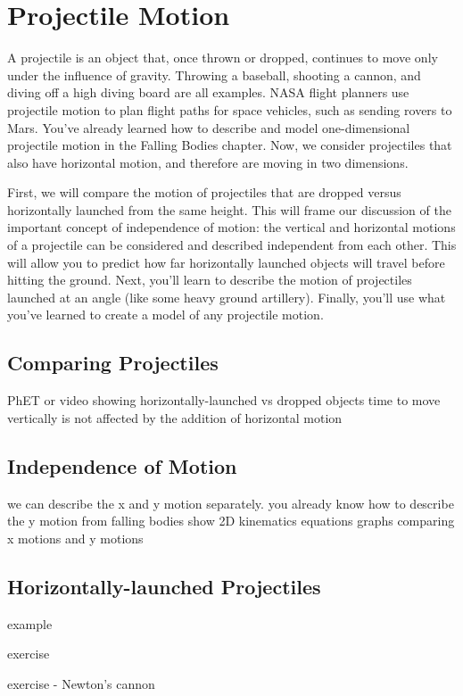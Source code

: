 \chapter{Projectile Motion}

A projectile is an object that, once thrown or dropped, continues to move only 
under the influence of gravity. Throwing a baseball, shooting a cannon, and 
diving off a high diving board are all examples. NASA flight planners use 
projectile motion to plan flight paths for space vehicles, such as sending 
rovers to Mars. You've already learned how to describe and model 
one-dimensional projectile motion in the Falling Bodies chapter. Now, we 
consider projectiles that also have horizontal motion, and therefore are 
moving in two dimensions. 

First, we will compare the motion of projectiles that are dropped versus 
horizontally launched from the same height. This will frame our discussion of 
the important concept of independence of motion: the vertical and horizontal 
motions of a projectile can be considered and described independent from each 
other. This will allow you to predict how far horizontally launched objects 
will travel before hitting the ground. Next, you'll learn to describe the 
motion of projectiles launched at an angle (like some heavy ground artillery). 
Finally, you'll use what you've learned to create a model of any projectile motion. 

\section{Comparing Projectiles}
PhET or video showing horizontally-launched vs dropped objects
time to move vertically is not affected by the addition of horizontal motion

\section{Independence of Motion}
we can describe the x and y motion separately. 
you already know how to describe the y motion from falling bodies
show 2D kinematics equations
graphs comparing x motions and y motions

\section{Horizontally-launched Projectiles}
example

exercise

exercise - Newton's cannon

